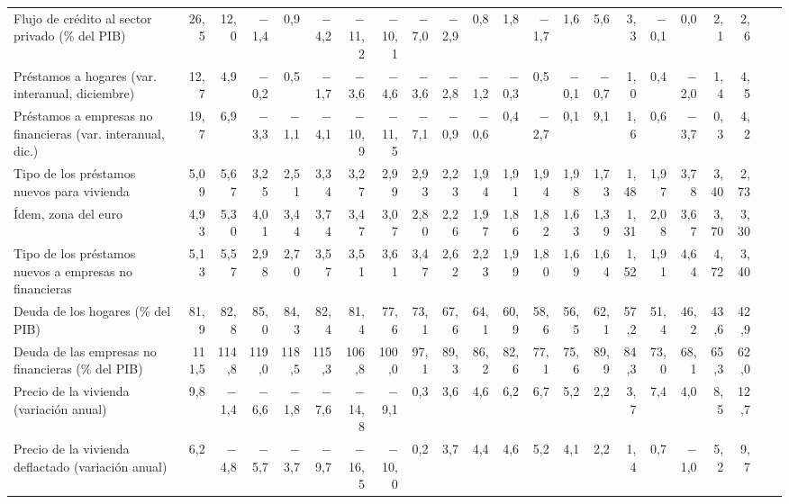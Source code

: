 \begin{tabular}{@{}>{\raggedright\arraybackslash}p{\dimexpr\anchoetq-\tabcolsep\relax}*{21}{N}@{}}
Flujo de crédito al sector privado (\% del PIB) & 26{,}5 & 12{,}0 & $-$1{,}4 & 0{,}9 & $-$4{,}2 & $-$11{,}2 & $-$10{,}1 & $-$7{,}0 & $-$2{,}9 & 0{,}8 & 1{,}8 & $-$1{,}7 & 1{,}6 & 5{,}6 & 3{,}3 & $-$0{,}1 & 0{,}0 & 2{,}1 & 2{,}6 &  &  \\
Préstamos a hogares (var. interanual, diciembre) & 12{,}7 & 4{,}9 & $-$0{,}2 & 0{,}5 & $-$1{,}7 & $-$3{,}6 & $-$4{,}6 & $-$3{,}6 & $-$2{,}8 & $-$1{,}2 & $-$0{,}3 & 0{,}5 & $-$0{,}1 & $-$0{,}7 & 1{,}0 & 0{,}4 & $-$2{,}0 & 1{,}4 & 4{,}5 &  &  \\
Préstamos a empresas no financieras (var. interanual, dic.) & 19{,}7 & 6{,}9 & $-$3{,}3 & $-$1{,}1 & $-$4{,}1 & $-$10{,}9 & $-$11{,}5 & $-$7{,}1 & $-$0{,}9 & $-$0{,}6 & 0{,}4 & $-$2{,}7 & 0{,}1 & 9{,}1 & 1{,}6 & 0{,}6 & $-$3{,}7 & 0{,}3 & 4{,}2 &  &  \\
Tipo de los préstamos nuevos para vivienda & 5{,}09 & 5{,}67 & 3{,}25 & 2{,}51 & 3{,}34 & 3{,}27 & 2{,}99 & 2{,}93 & 2{,}23 & 1{,}94 & 1{,}91 & 1{,}94 & 1{,}98 & 1{,}73 & 1{,}48 & 1{,}97 & 3{,}78 & 3{,}40 & 2{,}73 &  &  \\
\hspace*{0.8em}Ídem, zona del euro & 4{,}93 & 5{,}30 & 4{,}01 & 3{,}44 & 3{,}74 & 3{,}47 & 3{,}07 & 2{,}80 & 2{,}26 & 1{,}97 & 1{,}86 & 1{,}82 & 1{,}63 & 1{,}39 & 1{,}31 & 2{,}08 & 3{,}67 & 3{,}70 & 3{,}30 &  &  \\
Tipo de los préstamos nuevos a empresas no financieras & 5{,}13 & 5{,}57 & 2{,}98 & 2{,}70 & 3{,}57 & 3{,}51 & 3{,}61 & 3{,}47 & 2{,}62 & 2{,}23 & 1{,}99 & 1{,}80 & 1{,}69 & 1{,}64 & 1{,}52 & 1{,}91 & 4{,}64 & 4{,}72 & 3{,}40 &  &  \\
Deuda de los hogares (\% del PIB) & 81{,}9 & 82{,}8 & 85{,}0 & 84{,}3 & 82{,}4 & 81{,}4 & 77{,}6 & 73{,}1 & 67{,}6 & 64{,}1 & 60{,}9 & 58{,}6 & 56{,}5 & 62{,}1 & 57{,}2 & 51{,}4 & 46{,}2 & 43{,}6 & 42{,}9 &  &  \\
Deuda de las empresas no financieras (\% del PIB) & 111{,}5 & 114{,}8 & 119{,}0 & 118{,}5 & 115{,}3 & 106{,}8 & 100{,}0 & 97{,}1 & 89{,}3 & 86{,}2 & 82{,}6 & 77{,}1 & 75{,}6 & 89{,}9 & 84{,}3 & 73{,}0 & 68{,}1 & 65{,}3 & 62{,}0 &  &  \\
Precio de la vivienda (variación anual) & 9{,}8 & $-$1{,}4 & $-$6{,}6 & $-$1{,}8 & $-$7{,}6 & $-$14{,}8 & $-$9{,}1 & 0{,}3 & 3{,}6 & 4{,}6 & 6{,}2 & 6{,}7 & 5{,}2 & 2{,}2 & 3{,}7 & 7{,}4 & 4{,}0 & 8{,}5 & 12{,}7 &  &  \\
\hspace*{0.8em}Precio de la vivienda deflactado (variación anual) & 6{,}2 & $-$4{,}8 & $-$5{,}7 & $-$3{,}7 & $-$9{,}7 & $-$16{,}5 & $-$10{,}0 & 0{,}2 & 3{,}7 & 4{,}4 & 4{,}6 & 5{,}2 & 4{,}1 & 2{,}2 & 1{,}4 & 0{,}7 & $-$1{,}0 & 5{,}2 & 9{,}7 &  &  \\
\bottomrule
\end{tabular}
